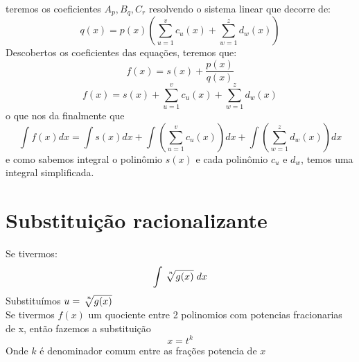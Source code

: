 \documentclass[14pt]{extreport}
\theoremstyle{definition}
\begin{document}
teremos os coeficientes \(A_p, B_q, C_r\) resolvendo o sistema linear que decorre de:
\begin{equation}
    q(x) = 
        p(x)
            \left(
                \sum_{u = 1}^{v} 
            c_u(x) + 
                \sum_{w = 1}^{z} 
            d_w(x)
            \right)
\end{equation}
Descobertos os coeficientes das equações, teremos que:
\begin{equation}
    f(x) = 
        s(x) + \frac{p(x)}{q(x)}
\end{equation}
\begin{equation}
    f(x) = 
        s(x) + 
        \sum_{u = 1}^{v} 
            c_u(x) + 
        \sum_{w = 1}^{z} 
            d_w(x)
\end{equation}
o que nos da finalmente que
\begin{equation}
    \int f(x) dx = 
        \int s(x)dx + 
        \int 
            \left(
                \sum_{u = 1}^{v} c_u(x)
            \right)
        dx
        + 
        \int 
            \left(
                \sum_{w = 1}^{z} d_w(x)
            \right)
        dx
\end{equation}
e como sabemos integral o polinômio \(s(x)\) e cada polinômio \(c_u\) e \(d_w\), temos uma integral simplificada.
\section{Substituição racionalizante}

Se tivermos:
\begin{equation}
    \int \sqrt[\leftroot{-3}\uproot{3}n]{g(x)}\; dx
\end{equation}
Substituímos \( u = \sqrt[\leftroot{-3}\uproot{3}n]{g(x)} \)
\\
Se tivermos \(f(x)\) um quociente entre 2 polinomios com potencias fracionarias de x, então fazemos a substituição 
\begin{equation}
    x = t^k
\end{equation} 
Onde \(k\) é denominador comum entre as frações potencia de \(x\)
\end{document}
